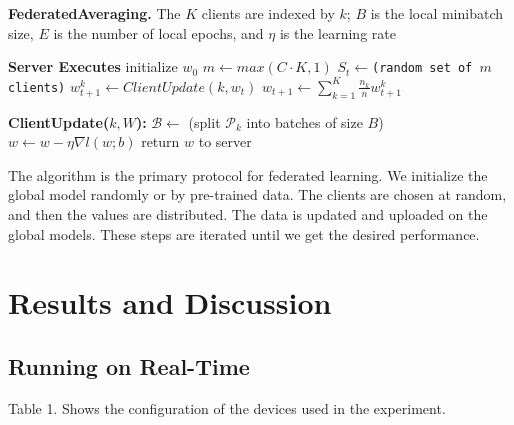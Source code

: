 \documentclass[conference]{IEEEtran}
\begin{document}
\begin{algorithm}
\caption{\textbf{FederatedAveraging.} The $K$ clients are
indexed by $k$; $B$ is the local minibatch size, $E$ is the number
of local epochs, and $\eta$ is the learning rate}\label{alg:cap}
\begin{algorithmic}[1]
\State \textbf{Server Executes}
\State initialize $w_0$
        \State \texttt{$m \gets max(C\cdot K,1)$}
        \State \texttt{$S_t \gets $(random set of $m$ clients)}
        \State $w_{t+1}^{k} \gets ClientUpdate(k,w_t)$
        \EndFor
        \State $w_{t+1} \gets \sum_{k=1}^{K} \frac{n_k}{n} w_{t+1}^{k}$
        
      \EndFor
      \State
\State \textbf{ClientUpdate($k,W$):} 
\State $\mathcal{B} \gets$ (split $\mathcal{P}_k$ into batches of size $B$)
    \State $w \gets w - \eta \nabla l(w;b)$
\EndFor
\EndFor
\State return $w$ to server

\end{algorithmic}
\end{algorithm}



The algorithm is the primary protocol for federated learning. We initialize the global model randomly or by pre-trained data. The clients are chosen at random, and then the values are distributed. The data is updated and uploaded on the global models. These steps are iterated until we get the desired performance.
\section{Results and Discussion}
\subsection{Running on Real-Time}
Table 1. Shows the configuration of the devices used in the experiment. 
\end{document}
